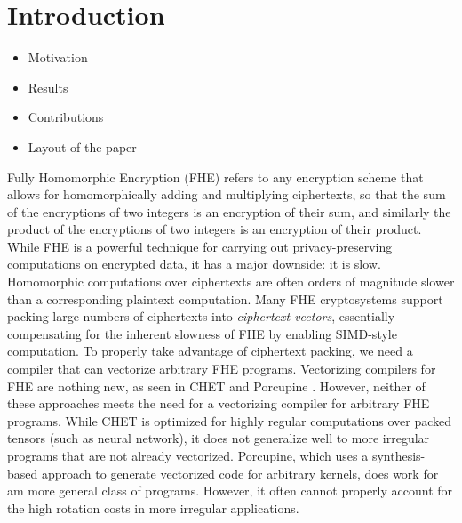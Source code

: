 \section{Introduction}\label{sec:intro}
\begin{itemize}
    \item Motivation
    \item Results
    \item Contributions
    \item Layout of the paper
\end{itemize}

Fully Homomorphic Encryption (FHE) refers to any encryption scheme that allows for homomorphically adding and multiplying ciphertexts, so that the sum of the encryptions of two integers is an encryption of their sum, and similarly the product of the encryptions of two integers is an encryption of their product.
While FHE is a powerful technique for carrying out privacy-preserving computations on encrypted data, it has a major downside: it is slow.
Homomorphic computations over ciphertexts are often orders of magnitude slower than a corresponding plaintext computation.
Many FHE cryptosystems support packing large numbers of ciphertexts into {\em ciphertext vectors}, essentially compensating for the inherent slowness of FHE by enabling SIMD-style computation.
To properly take advantage of ciphertext packing, we need a compiler that can vectorize arbitrary FHE programs.
Vectorizing compilers for FHE are nothing new, as seen in CHET and Porcupine \cite{CHET, Porcupine}.
However, neither of these approaches meets the need for a vectorizing compiler for arbitrary FHE programs.
While CHET is optimized for highly regular computations over packed tensors (such as neural network), it does not generalize well to more irregular programs that are not already vectorized. 
Porcupine, which uses a synthesis-based approach to generate vectorized code for arbitrary kernels, does work for am more general class of programs.
However, it often cannot properly account for the high rotation costs in more irregular applications. 


